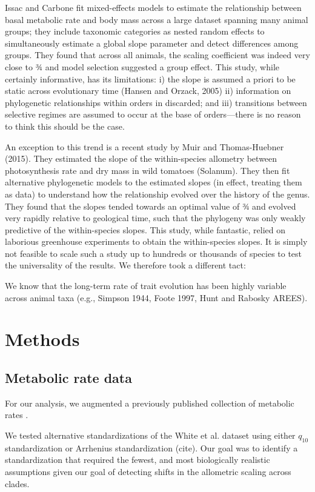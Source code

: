 \documentclass[a4paper,11pt]{article}
\begin{document}
Issac and Carbone \citep{issac2010} fit mixed-effects models to estimate the relationship between basal metabolic rate and body mass across a large dataset spanning many animal groups; they include taxonomic categories as nested random effects to simultaneously estimate a global slope parameter and detect differences among groups. They found that across all animals, the scaling coefficient was indeed very close to ¾ and model selection suggested a group effect. This study, while certainly informative, has its limitations: i) the slope is assumed a priori to be static across evolutionary time (Hansen and Orzack, 2005) ii) information on phylogenetic relationships within orders in discarded; and iii) transitions between selective regimes are assumed to occur at the base of orders---there is no reason to think this should be the case.

An exception to this trend is a recent study by Muir and Thomas-Huebner (2015). They estimated the slope of the within-species allometry between photosynthesis rate and dry mass in wild tomatoes (Solanum). They then fit alternative phylogenetic models to the estimated slopes (in effect, treating them as data) to understand how the relationship evolved over the history of the genus. They found that the slopes tended towards an optimal value of ¾ and evolved very rapidly relative to geological time, such that the phylogeny was only weakly predictive of the within-species slopes. This study, while fantastic, relied on laborious greenhouse experiments to obtain the within-species slopes. It is simply not feasible to scale such a study up to hundreds or thousands of species to test the universality of the results. We therefore took a different tact: 

We know that the long-term rate of trait evolution has been highly variable across animal taxa (e.g., Simpson 1944, Foote 1997, Hunt and Rabosky AREES).

\section*{Methods}

\subsection*{Metabolic rate data}
For our analysis, we augmented a previously published collection of metabolic rates \citep{white2006}.

We tested alternative standardizations of the White et al. dataset using either $q_{10}$ standardization or Arrhenius standardization (cite). Our goal was to identify a standardization that required the fewest, and most biologically realistic assumptions given our goal of detecting shifts in the allometric scaling across clades. 
\end{document}
